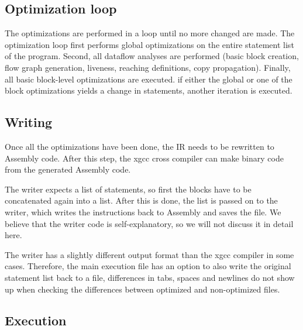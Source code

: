 \documentclass[10pt,a4paper]{article}
\begin{document}
\subsection{Optimization loop}

The optimizations are performed in a loop until no more changed are made. The
optimization loop first performs global optimizations on the entire statement
list of the program. Second, all dataflow analyses are performed (basic block
creation, flow graph generation, liveness, reaching definitions, copy
propagation). Finally, all basic block-level optimizations are executed. if
either the global or one of the block optimizations yields a change in
statements, another iteration is executed.

\subsection{Writing}

Once all the optimizations have been done, the IR needs to be rewritten to
Assembly code. After this step, the xgcc cross compiler can make binary code
from the generated Assembly code.

The writer expects a list of statements, so first the blocks have to be
concatenated again into a list. After this is done, the list is passed on to
the writer, which writes the instructions back to Assembly and saves the file.
We believe that the writer code is self-explanatory, so we will not discuss it
in detail here.

The writer has a slightly different output format than the xgcc compiler in
some cases. Therefore, the main execution file has an option to also write the
original statement list back to a file, differences in tabs, spaces and
newlines do not show up when checking the differences between optimized and
non-optimized files.

\subsection{Execution}
\end{document}
